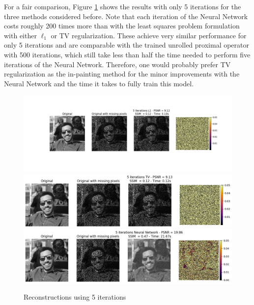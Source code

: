 \documentclass{article}
\begin{document}
\begin{enumerate}[label=2.\arabic*]
    For a fair comparison, Figure \ref{fig:5} shows the results with only 5 iterations for the three methods considered before. Note that each iteration of the Neural Network costs roughly 200 times more than with the least squares problem formulation with either $\ell_1$ or TV regularization. These achieve very similar performance for only 5 iterations and are comparable with the trained unrolled proximal operator with 500 iterations, which still take less than half the time needed to perform five iterations of the Neural Network. Therefore, one would probably prefer TV regularization as the in-painting method for the minor improvements with the Neural Network and the time it takes to fully train this model.
    
    \begin{figure}[H]
        \centering
        \includegraphics[trim={4.5cm 3.5cm 2.5cm 0cm},clip,width=\textwidth]{img/l1_5.png}
        \includegraphics[trim={.5cm .25cm .25cm 0cm},clip,width=\textwidth]{img/tv_5.png}
        \includegraphics[trim={.5cm .25cm .25cm 0cm},clip,width=\textwidth]{img/nn_5.png}
        \caption{Reconstructions using 5 iterations}
        \label{fig:5}
    \end{figure}
\end{enumerate}
\end{document}
